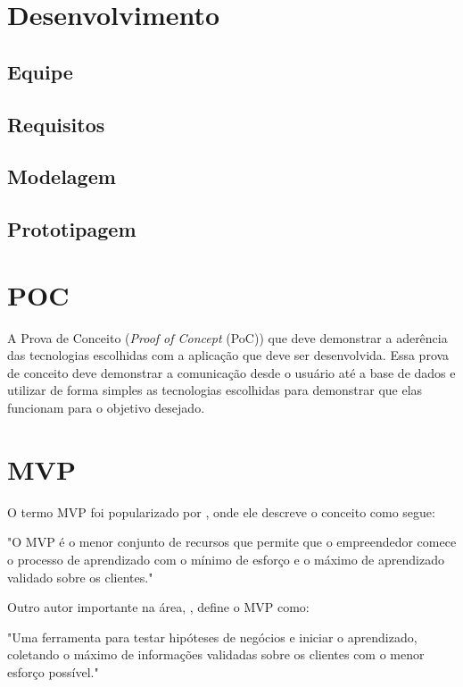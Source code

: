\documentclass[
	article,			%
	12pt,				%
	oneside,			%
	a4paper,			%
	english,			%
	brazil,				%
	sumario=tradicional
	]{abntex2}
\begin{document}
\section{Desenvolvimento}

\subsection{Equipe}
\lipsum[1]

\subsection{Requisitos}
\lipsum[1]

\subsection{Modelagem}
\lipsum[1]

\subsection{Prototipagem}
\lipsum[1]

\section{POC}

A Prova de Conceito (\textit{Proof of Concept} (PoC)) que deve demonstrar a aderência das tecnologias escolhidas com a aplicação que deve ser desenvolvida. Essa prova de conceito deve demonstrar a comunicação desde o usuário até a base de dados e utilizar de forma simples as tecnologias escolhidas para demonstrar que
elas funcionam para o objetivo desejado.

\section{MVP}

O termo MVP foi popularizado por  , onde ele descreve o conceito como segue:

"O MVP é o menor conjunto de recursos que permite que o empreendedor comece o processo de aprendizado com o mínimo de esforço e o máximo de aprendizado validado sobre os clientes."

Outro autor importante na área, , define o MVP como:

"Uma ferramenta para testar hipóteses de negócios e iniciar o aprendizado, coletando o máximo de informações validadas sobre os clientes com o menor esforço possível."
\end{document}
